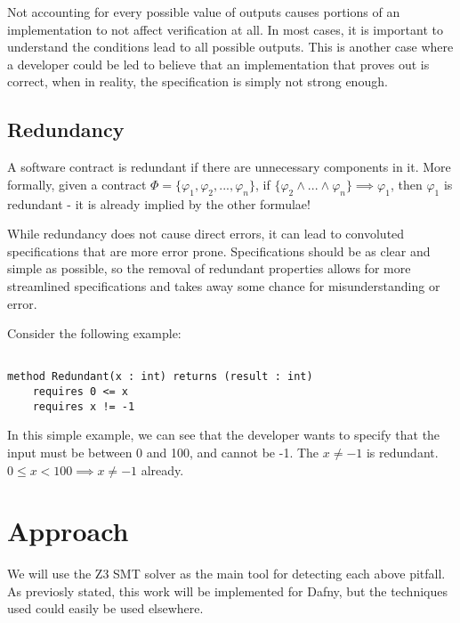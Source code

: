 \documentclass{article}
\newif\ifcomments
\newcommand{\egm}[1]{\ifcomments\textcolor{orange}{egm: #1}\fi}
\newcommand{\cass}[1]{\ifcomments\textcolor{blue}{cass: #1}\fi}
\begin{document}
Not accounting for every possible value of outputs causes portions of an implementation to not affect verification at all. In
most cases, it is important to understand the conditions lead to all possible outputs. This is another case where a
developer could be led to believe that an implementation that proves out is correct, when in reality, the specification is
simply not strong enough.

\subsection{Redundancy}

A software contract is redundant if there are unnecessary components in it. More formally, given a contract
\(\Phi = \{\varphi_{1}, \varphi_{2}, ..., \varphi_{n}\}\), if \(\{\varphi_{2} \land ... \land \varphi_{n}\} \implies \varphi_{1}\), then
\(\varphi_{1}\) is redundant - it is already implied by the other formulae!

While redundancy does not cause direct errors, it can lead to convoluted specifications that are more error prone. Specifications should be as
clear and simple as possible, so the removal of redundant properties allows for more streamlined specifications and takes away some chance
for misunderstanding or error.

Consider the following example:

\begin{lstlisting}[language=dafny]

method Redundant(x : int) returns (result : int)
    requires 0 <= x
    requires x != -1

\end{lstlisting}

In this simple example, we can see that the developer wants to specify that the input must be between 0 and 100, and cannot be
-1. The \(x \neq -1\) is redundant. \(0 \leq x < 100 \implies x \neq -1\) already.
\egm{How does the first requires exclude 50? I commonly see things like $m \le n \wedge m < n$.}
\cass{Took out the 50.}
\egm{Create a single section for all the above contract issues and make each type of issue a subsection. You can use subsubsection or \textbackslash paragraph if needed.}
\cass{Done.}
\section{Approach}

We will use the Z3 SMT solver as the main tool for detecting each above pitfall. As previosly stated,
this work will be implemented for Dafny, but the techniques used could easily be used elsewhere.
\end{document}
